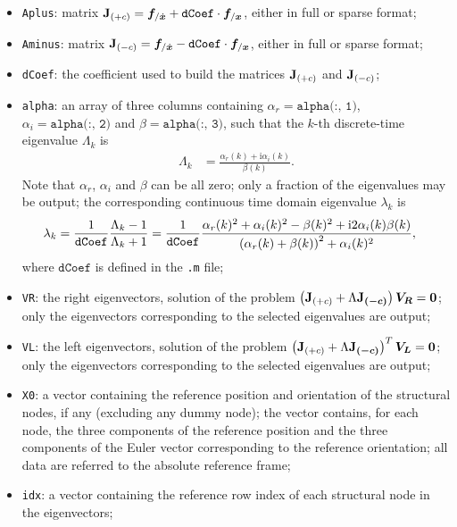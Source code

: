 \begin{itemize}
\item \texttt{Aplus}: 
matrix
$\bm{\mathbf J}_{(+c)} = \boldsymbol{f}_{/\dot{\boldsymbol{x}}} + \texttt{dCoef} \cdot \boldsymbol{f}_{/\boldsymbol{x}}$,
either in full or sparse format;

\item \texttt{Aminus}: 
matrix
$\bm{\mathbf J}_{(-c)} = \boldsymbol{f}_{/\dot{\boldsymbol{x}}} - \texttt{dCoef} \cdot \boldsymbol{f}_{/\boldsymbol{x}}$,
either in full or sparse format;

\item \texttt{dCoef}: the coefficient used to build the matrices
$\bm{\mathbf J}_{(+c)}$ and $\bm{\mathbf J}_{(-c)}$;

\item \texttt{alpha}:
an array of three columns containing
$\alpha_r = \texttt{alpha(:, 1)}$,
$\alpha_i = \texttt{alpha(:, 2)}$
and $\beta = \texttt{alpha(:, 3)}$,
such that the $k$-th discrete-time eigenvalue $\Lambda_k$ is
\begin{align}
	\Lambda_k
	&=
	\frac{\alpha_r(k) + \text{i} \alpha_i(k)}{\beta(k)}
	.
\end{align}
Note that $\alpha_r$, $\alpha_i$ and $\beta$ can be all zero;
only a fraction of the eigenvalues may be output;
the corresponding continuous time domain eigenvalue $\lambda_k$ is
\begin{align}
	\lambda_k
	&=
	\frac{1}{\texttt{dCoef}}
	\frac{\Lambda_k - 1}{\Lambda_k + 1}
	=
	\frac{1}{\texttt{dCoef}}
	\frac{
		\alpha_r(k)^2
		+
		\alpha_i(k)^2
		-
		\beta(k)^2
		+
		\text{i} 2 \alpha_i(k) \beta(k)
	}{
		\left( \alpha_r(k) + \beta(k) \right)^2 + \alpha_i(k)^2
	}
	,
\end{align}
where $\texttt{dCoef}$ is defined in the \texttt{.m} file;

\item \texttt{VR}: the right eigenvectors, solution of the problem
$\left( \bm{\mathbf J}_{(+c)} + \Lambda \bm{\mathbf J_{(-c)}} \right)\boldsymbol{V_R}=\boldsymbol{0}$;
only the eigenvectors corresponding to the selected eigenvalues are output;

\item \texttt{VL}: the left eigenvectors, solution of the problem
$\left( \bm{\mathbf J}_{(+c)} + \Lambda \bm{\mathbf J_{(-c)}} \right)^T\boldsymbol{V_L}=\boldsymbol{0}$;
only the eigenvectors corresponding to the selected eigenvalues are output;

\item \texttt{X0}: a vector containing the reference position
and orientation of the structural nodes, if any (excluding any dummy node);
the vector contains, for each node, the three components
of the reference position and the three components of the Euler vector
corresponding to the reference orientation; all data are referred
to the absolute reference frame;

\item \texttt{idx}: a vector containing the reference row index
of each structural node in the eigenvectors;
\end{itemize}

